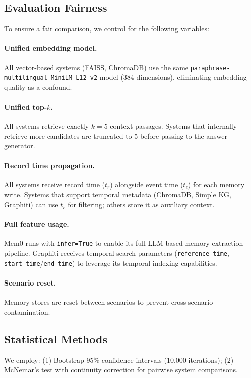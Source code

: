 \subsection{Evaluation Fairness}
To ensure a fair comparison, we control for the following variables:

\paragraph{Unified embedding model.}
All vector-based systems (FAISS, ChromaDB) use the same \texttt{paraphrase-multilingual-MiniLM-L12-v2} model (384 dimensions), eliminating embedding quality as a confound.

\paragraph{Unified top-$k$.}
All systems retrieve exactly $k{=}5$ context passages. Systems that internally retrieve more candidates are truncated to 5 before passing to the answer generator.

\paragraph{Record time propagation.}
All systems receive record time ($t_r$) alongside event time ($t_e$) for each memory write. Systems that support temporal metadata (ChromaDB, Simple KG, Graphiti) can use $t_r$ for filtering; others store it as auxiliary context.

\paragraph{Full feature usage.}
Mem0 runs with \texttt{infer=True} to enable its full LLM-based memory extraction pipeline. Graphiti receives temporal search parameters (\texttt{reference\_time}, \texttt{start\_time}/\texttt{end\_time}) to leverage its temporal indexing capabilities.

\paragraph{Scenario reset.}
Memory stores are reset between scenarios to prevent cross-scenario contamination.

\subsection{Statistical Methods}
We employ: (1) Bootstrap 95\% confidence intervals (10,000 iterations); (2) McNemar's test with continuity correction for pairwise system comparisons.
